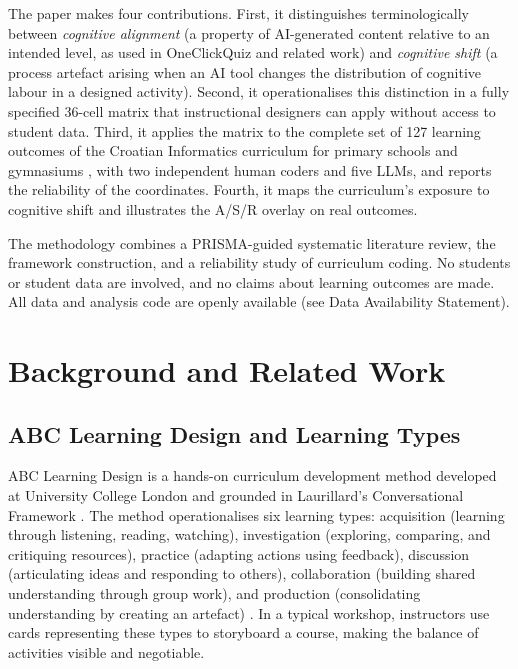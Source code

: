 \documentclass[journal,article,submit,pdftex,moreauthors]{Definitions/mdpi}
\begin{document}
The paper makes four contributions. First, it distinguishes terminologically between \emph{cognitive alignment} (a property of AI-generated content relative to an intended level, as used in OneClickQuiz and related work) and \emph{cognitive shift} (a process artefact arising when an AI tool changes the distribution of cognitive labour in a designed activity). Second, it operationalises this distinction in a fully specified 36-cell matrix that instructional designers can apply without access to student data. Third, it applies the matrix to the complete set of 127 learning outcomes of the Croatian Informatics curriculum for primary schools and gymnasiums \cite{croatia_informatics_2018}, with two independent human coders and five LLMs, and reports the reliability of the coordinates. Fourth, it maps the curriculum's exposure to cognitive shift and illustrates the A/S/R overlay on real outcomes.

The methodology combines a PRISMA-guided systematic literature review, the framework construction, and a reliability study of curriculum coding. No students or student data are involved, and no claims about learning outcomes are made. All data and analysis code are openly available (see Data Availability Statement).

\section{Background and Related Work}
\label{sec:related}

\subsection{ABC Learning Design and Learning Types}

ABC Learning Design is a hands-on curriculum development method developed at University College London and grounded in Laurillard's Conversational Framework \cite{laurillard_2012, young_perovic_2016}. The method operationalises six learning types: acquisition (learning through listening, reading, watching), investigation (exploring, comparing, and critiquing resources), practice (adapting actions using feedback), discussion (articulating ideas and responding to others), collaboration (building shared understanding through group work), and production (consolidating understanding by creating an artefact) \cite{abcld_6types}. In a typical workshop, instructors use cards representing these types to storyboard a course, making the balance of activities visible and negotiable.
\end{document}
